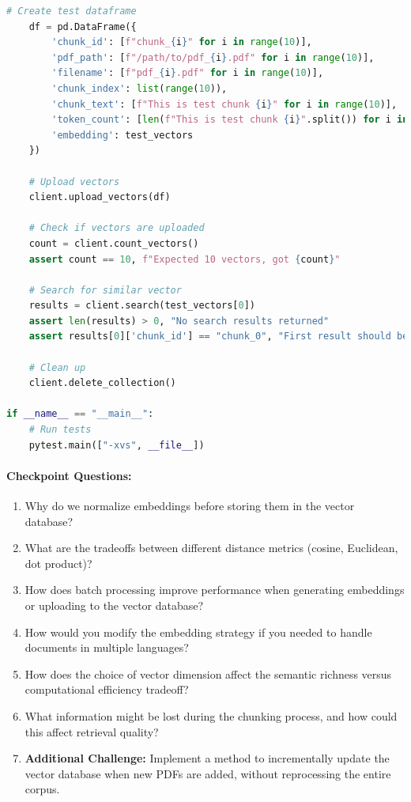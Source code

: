 \documentclass[
  screen,review,acmlarge]{acmart}
\providecommand{\tightlist}{%
  \setlength{\itemsep}{0pt}\setlength{\parskip}{0pt}}
\begin{document}
\begin{lstlisting}[language=Python]
    # Create test dataframe
    df = pd.DataFrame({
        'chunk_id': [f"chunk_{i}" for i in range(10)],
        'pdf_path': [f"/path/to/pdf_{i}.pdf" for i in range(10)],
        'filename': [f"pdf_{i}.pdf" for i in range(10)],
        'chunk_index': list(range(10)),
        'chunk_text': [f"This is test chunk {i}" for i in range(10)],
        'token_count': [len(f"This is test chunk {i}".split()) for i in range(10)],
        'embedding': test_vectors
    })
    
    # Upload vectors
    client.upload_vectors(df)
    
    # Check if vectors are uploaded
    count = client.count_vectors()
    assert count == 10, f"Expected 10 vectors, got {count}"
    
    # Search for similar vector
    results = client.search(test_vectors[0])
    assert len(results) > 0, "No search results returned"
    assert results[0]['chunk_id'] == "chunk_0", "First result should be the query vector itself"
    
    # Clean up
    client.delete_collection()

if __name__ == "__main__":
    # Run tests
    pytest.main(["-xvs", __file__])
\end{lstlisting}

\paragraph{Checkpoint Questions:}\label{checkpoint-questions-3}

\begin{enumerate}
\def\labelenumi{\arabic{enumi}.}
\tightlist
\item
  Why do we normalize embeddings before storing them in the vector database?
\item
  What are the tradeoffs between different distance metrics (cosine, Euclidean, dot product)?
\item
  How does batch processing improve performance when generating embeddings or uploading to the vector database?
\item
  How would you modify the embedding strategy if you needed to handle documents in multiple languages?
\item
  How does the choice of vector dimension affect the semantic richness versus computational efficiency tradeoff?
\item
  What information might be lost during the chunking process, and how could this affect retrieval quality?
\item
  \textbf{Additional Challenge:} Implement a method to incrementally update the vector database when new PDFs are added, without reprocessing the entire corpus.
\end{enumerate}
\end{document}
